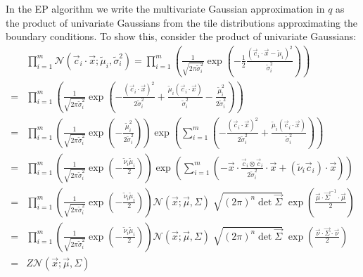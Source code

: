 \documentclass[11pt,twoside]{report}
\begin{document}
In the EP algorithm we write the multivariate Gaussian approximation in $q$ as the product of univariate Gaussians from the tile distributions approximating the boundary conditions.
To show this, consider the product of univariate Gaussians:
\begin{align}
    &
    \prod_{i=1}^m
    \mathcal{N}(\vec{c}_i \cdot \vec{x}; \tilde{\mu}_i, \tilde{\sigma}_i^2)
    =
    \prod_{i=1}^m
    \left(
    \frac{1}{\sqrt{ 2\pi \tilde{\sigma}_i^2 }}
    \exp{\left(
      - \frac{1}{2} \frac{(\vec{c}_i \cdot \vec{x} - \tilde{\mu}_i)^2}{\tilde{\sigma}_i^2}
      \right)}
    \right)
    \nonumber \\ =&
    \prod_{i=1}^m
    \left(
    \frac{1}{\sqrt{ 2\pi \tilde{\sigma}_i^2 }}
    \exp{\left(
      - \frac{(\vec{c}_i \cdot \vec{x})^2}{2\tilde{\sigma}_i^2}
      + \frac{\tilde{\mu}_i(\vec{c}_i \cdot \vec{x})}{\tilde{\sigma}_i^2}
      - \frac{\tilde{\mu}_i^2}{2\tilde{\sigma}_i^2}
      \right)}
    \right)
    \nonumber \\ =&
    \prod_{i=1}^m
    \left(
    \frac{1}{\sqrt{ 2\pi \tilde{\sigma}_i^2 }}
    \exp{\left(-\frac{\tilde{\mu}_i^2}{2\tilde{\sigma}_i^2}\right)}
    \right)
    \exp{\left( \sum_{i=1}^m \left(
      - \frac{(\vec{c}_i \cdot \vec{x})^2}{2\tilde{\sigma}_i^2}
      + \frac{\tilde{\mu}_i(\vec{c}_i \cdot \vec{x})}{\tilde{\sigma}_i^2}
      \right) \right)}
    \nonumber \\ =&
    \prod_{i=1}^m
    \left(
    \frac{1}{\sqrt{ 2\pi \tilde{\sigma}_i^2 }}
    \exp{\left(-\frac{\tilde{\nu}_i \tilde{\mu}_i}{2}\right)}
    \right)
    \exp{\left( \sum_{i=1}^m \left(
      - \vec{x} \cdot \frac{\vec{c}_i \otimes \vec{c}_i}{2\tilde{\sigma}_i^2} \cdot \vec{x}
      + (\tilde{\nu}_i\vec{c}_i) \cdot \vec{x}
      \right) \right)}
    \nonumber \\ =&
    \prod_{i=1}^m
    \left(
    \frac{1}{\sqrt{ 2\pi \tilde{\sigma}_i^2 }}
    \exp{\left(-\frac{\tilde{\nu}_i \tilde{\mu}_i}{2}\right)}
    \right)
    \mathcal{N}(\vec{x}; \vec{\mu}, \Sigma)
    \;
    \sqrt{ (2\pi)^n \det{\vec{\Sigma}} }
    \;
    \exp{\left( \frac{\vec{\mu} \cdot \vec{\Sigma}^{-1} \cdot \vec{\mu}}{2} \right)}
    \nonumber \\ =&
    \prod_{i=1}^m
    \left(
    \frac{1}{\sqrt{ 2\pi \tilde{\sigma}_i^2 }}
    \exp{\left(-\frac{\tilde{\nu}_i \tilde{\mu}_i}{2}\right)}
    \right)
    \mathcal{N}(\vec{x}; \vec{\mu}, \Sigma)
    \;
    \sqrt{ (2\pi)^n \det{\vec{\Sigma}} }
    \;
    \exp{\left( \frac{\vec{\nu} \cdot \vec{\Sigma} \cdot \vec{\nu}}{2} \right)}
    \nonumber \\ =&
    Z \mathcal{N}(\vec{x}; \vec{\mu}, \Sigma)
  \label{eq:combined-normals}
\end{align}
\end{document}
